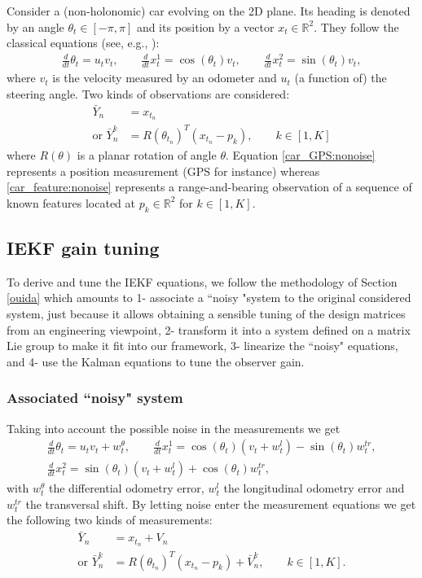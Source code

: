 \documentclass[a4paper,12pt,onecolumn]{article}
\newcommand{\RR}{{\mathbb{R}}}
\begin{document}
Consider a (non-holonomic) car evolving on the 2D plane. Its heading is denoted by an angle $\theta_t \in [-\pi,\pi]$ and its position by a vector $x_t \in \RR^2$. They follow the classical equations (see, e.g., \cite{de1998feedback}):
\begin{align}\label{car:dyna}
\frac{d}{dt} \theta_t  = u_t v_t , \qquad
\frac{d}{dt} x^1_t  = \cos(\theta_t) v_t , \qquad
\frac{d}{dt} x^2_t  = \sin(\theta_t) v_t ,
\end{align}
where $v_t$ is the velocity measured by an odometer and $u_t$ (a function of) the steering angle. Two kinds of observations are considered:
\begin{align}
\bar{Y}_n & = x_{t_n} \label{car_GPS:nonoise} \\
\text{or } \bar{Y}_n^k & = R(\theta_{t_n})^T(x_{t_n}-p_k), \qquad k \in [1, K]\label{car_feature:nonoise}
\end{align}
where $R(\theta)$ is a planar rotation of angle $\theta$. Equation
\eqref{car_GPS:nonoise} represents a  position measurement (GPS for instance) whereas \eqref{car_feature:nonoise} represents a range-and-bearing observation of a sequence of known features located at $p_k \in \RR^2$ for $k \in [1, K]$.

\subsection{IEKF gain tuning}
\label{sect::gain_tuning_car}

To derive and tune the IEKF equations, we follow the methodology of Section \ref{ouida} which amounts to 1- associate a ``noisy "system to the original considered system, just because it allows obtaining a sensible  tuning of the design matrices from an engineering viewpoint, 2- transform it into a system defined on a matrix Lie group to make it fit into our framework, 3- linearize the ``noisy" equations, and 4- use the Kalman equations to tune the observer gain. 

\subsubsection{Associated ``noisy" system}
Taking into account the possible noise in the measurements we get
\begin{equation}\begin{gathered}\label{mec:eq}
\frac{d}{dt} \theta_t  = u_t v_t +w_t^{\theta}, \qquad
\frac{d}{dt} x^1_t  = \cos(\theta_t) (v_t + {w^l_t}) - \sin(\theta_t) {w^{tr}_t}, \\
\frac{d}{dt} x^2_t  = \sin(\theta_t) (v_t + {w^l_t}) + \cos(\theta_t){w^{tr}_t},
\end{gathered}\end{equation}
with $w_t^\theta$ the differential odometry error, ${w_t^l}$ the longitudinal odometry error and $w_t^{tr}$ the transversal shift. By letting noise enter the measurement equations we get the following two kinds of measurements:
\begin{align}
\bar{Y}_n & = x_{t_n} + V_n \label{car_GPS} \\
\text{or } \bar{Y}_n^k & = R(\theta_{t_n})^T(x_{t_n}-p_k) + \bar{V}_n^k, \qquad k \in [1, K].\label{car_feature}
\end{align}
\end{document}
